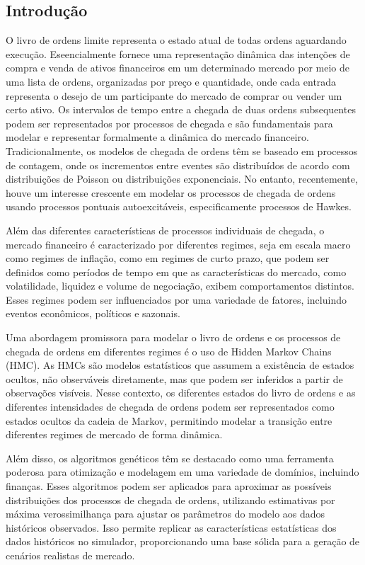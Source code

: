 \begin{btUnit}
\chapter{Introdução}

O livro de ordens limite representa o estado atual de todas ordens aguardando execução. Eseencialmente fornece uma representação dinâmica das intenções de compra e venda de ativos financeiros em um determinado mercado por meio de uma lista de ordens, organizadas por preço e quantidade, onde cada entrada representa o desejo de um participante do mercado de comprar ou vender um certo ativo. Os intervalos de tempo entre a chegada de duas ordens subsequentes podem ser representados por processos de chegada e são fundamentais para modelar e representar formalmente a dinâmica do mercado financeiro. Tradicionalmente, os modelos de chegada de ordens têm se baseado em processos de contagem, onde os incrementos entre eventes são distribuídos de acordo com distribuições de Poisson ou distribuições exponenciais. No entanto, recentemente, houve um interesse crescente em modelar os processos de chegada de ordens usando processos pontuais autoexcitáveis, especificamente processos de Hawkes. 

Além das diferentes características de processos individuais de chegada, o mercado financeiro é caracterizado por diferentes regimes, seja em escala macro como regimes de inflação, como em regimes de curto prazo, que podem ser definidos como períodos de tempo em que as características do mercado, como volatilidade, liquidez e volume de negociação, exibem comportamentos distintos. Esses regimes podem ser influenciados por uma variedade de fatores, incluindo eventos econômicos, políticos e sazonais.

Uma abordagem promissora para modelar o livro de ordens e os processos de chegada de ordens em diferentes regimes é o uso de Hidden Markov Chains (HMC). As HMCs são modelos estatísticos que assumem a existência de estados ocultos, não observáveis diretamente, mas que podem ser inferidos a partir de observações visíveis. Nesse contexto, os diferentes estados do livro de ordens e as diferentes intensidades de chegada de ordens podem ser representados como estados ocultos da cadeia de Markov, permitindo modelar a transição entre diferentes regimes de mercado de forma dinâmica.

Além disso, os algoritmos genéticos têm se destacado como uma ferramenta poderosa para otimização e modelagem em uma variedade de domínios, incluindo finanças. Esses algoritmos podem ser aplicados para aproximar as possíveis distribuições dos processos de chegada de ordens, utilizando estimativas por máxima verossimilhança para ajustar os parâmetros do modelo aos dados históricos observados. Isso permite replicar as características estatísticas dos dados históricos no simulador, proporcionando uma base sólida para a geração de cenários realistas de mercado.


\end{btUnit}
